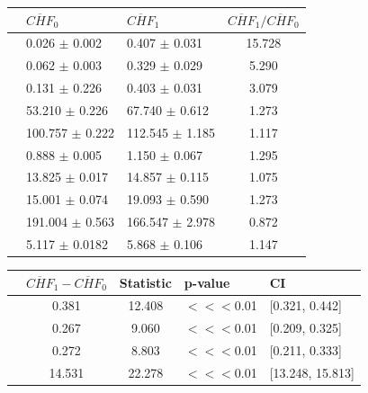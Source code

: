 \documentclass{article}
\begin{document}
\begin{center}
\begin{tcolorbox}[colframe=black, colback=white, boxrule=0.5pt, arc=6pt, width=\textwidth]
	\centering

\begin{tabular}{lllS} \toprule
     & {$\overline{CHF}_0$} & {$\overline{CHF}_1$} & {$\overline{CHF}_1 / \overline{CHF}_0$}  \\ \midrule
      & 0.026 $\pm$ 0.002 & 0.407 $\pm$ 0.031 & 15.728  \\
      & 0.062 $\pm$ 0.003 & 0.329 $\pm$ 0.029 & 5.290  \\ \midrule
      & 0.131 $\pm$ 0.226  & 0.403 $\pm$ 0.031 & 3.079  \\ 
      & 53.210 $\pm$ 0.226  & 67.740 $\pm$ 0.612 & 1.273  \\ \midrule
      & 100.757  $\pm$ 0.222 & 112.545 $\pm$ 1.185 & 1.117 \\
      & 0.888 $\pm$ 0.005 & 1.150 $\pm$ 0.067 & 1.295  \\ \midrule
      & 13.825 $\pm$ 0.017 & 14.857 $\pm$ 0.115 & 1.075 \\ 
      & 15.001 $\pm$ 0.074 & 19.093 $\pm$ 0.590 & 1.273 \\ \midrule
      & 191.004 $\pm$ 0.563 & 166.547 $\pm$ 2.978 & 0.872 \\ 
     & 5.117 $\pm$ 0.0182 & 5.868 $\pm$ 0.106 & 1.147  \\  \bottomrule
\end{tabular}
\par\vspace{1em}\par
\begin{tabular}{lSSll} \toprule
     & {$\overline{CHF}_1 - \overline{CHF}_0$} & {Statistic} & {p-value} & {CI} \\ \midrule
     & 0.381 & 12.408 & $<<<$0.01 & [0.321, 0.442] \\
     & 0.267 & 9.060 & $<<<$0.01 & [0.209, 0.325]  \\ \midrule
     & 0.272 & 8.803 & $<<<$0.01 & [0.211, 0.333] \\ 
     & 14.531 & 22.278  & $<<<$0.01 & [13.248, 15.813]     \\ \midrule

\end{tabular}
\end{tcolorbox}
\end{center}
\end{document}
